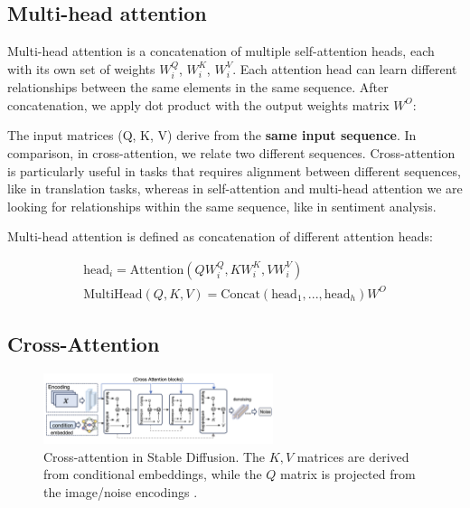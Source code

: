 \subsection{Multi-head attention}

Multi-head attention is a concatenation of multiple self-attention heads, each with its own set of weights $W_i^Q$, $W_i^K$, $W_i^V$. Each attention head can learn different relationships between the same elements in the same sequence. After concatenation, we apply dot product with the output weights matrix $W^O$:

The input matrices (Q, K, V) derive from the \textbf{same input sequence}. In comparison, in cross-attention, we relate two different sequences. Cross-attention is particularly useful in tasks that requires alignment between different sequences, like in translation tasks, whereas in self-attention and multi-head attention we are looking for relationships within the same sequence, like in sentiment analysis.

Multi-head attention is defined as concatenation of different attention heads:

\begin{equation}
    \begin{aligned}
        \text{head}_i = \text{Attention}(QW_i^Q, KW_i^K, VW_i^V)  \\
        \text{MultiHead}(Q, K, V) = \text{Concat}(\text{head}_1, ..., \text{head}_h)W^O
    \end{aligned}
\end{equation}














\subsection{Cross-Attention}

\begin{figure}[ht]
    \centering
    \includegraphics[width=0.6\textwidth]{images/diffusion_models/stable_diffusion/cross_attention.png}
    \caption{Cross-attention in Stable Diffusion. The $K,V$ matrices are derived from conditional embeddings, while the $Q$ matrix is projected from the image/noise encodings \cite{sun2024sora}.}
    \label{fig:cross_attention}
\end{figure}

